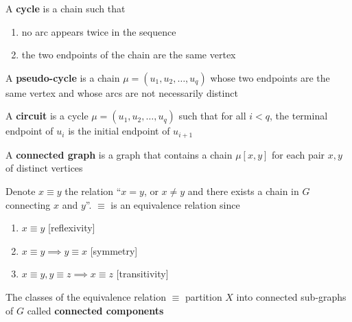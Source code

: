 \documentclass[aspectratio=43]{beamer}
\begin{document}
\begin{frame}
\begin{definition}[Cycle]
A \textbf{cycle} is a chain such that
\begin{enumerate}
\item no arc appears twice in the sequence
\item the two endpoints of the chain are the same vertex
\end{enumerate}
\end{definition}
\vfill
\begin{definition}
A \textbf{pseudo-cycle} is a chain $\mu=(u_1, u_2,\ldots,u_q)$ whose two endpoints are the same vertex and whose arcs are not necessarily distinct
\end{definition}
\vfill
\begin{definition}[Circuit]
A \textbf{circuit} is a cycle $\mu=(u_1, u_2,\ldots,u_q)$ such that for all $i<q$, the terminal endpoint of $u_i$ is the initial endpoint of $u_{i+1}$
\end{definition}
\end{frame}

\begin{frame}
\begin{definition}
A \textbf{connected graph} is a graph that contains a chain $\mu[x,y]$ for each pair $x,y$ of distinct vertices
\end{definition}
\vfill
Denote $x\equiv y$ the relation  ``$x=y$, or $x\neq y$ and there exists a chain in $G$ connecting $x$ and $y$''. $\equiv$ is an equivalence relation since
\begin{enumerate}
	\item $x\equiv y$ \hfill[reflexivity]
	\item $x\equiv y\implies y\equiv x$ \hfill[symmetry]
	\item $x\equiv y, y\equiv z\implies x\equiv z$ \hfill[transitivity]
\end{enumerate}
\begin{definition}
The classes of the equivalence relation $\equiv$ partition $X$ into connected sub-graphs of $G$ called \textbf{connected components}
\end{definition}
\end{frame}
\end{document}
